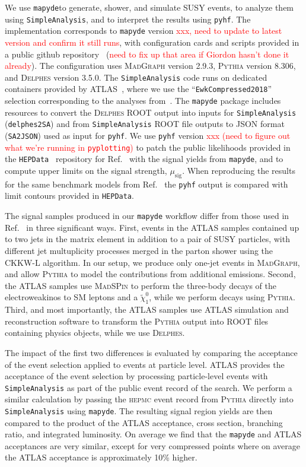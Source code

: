 \documentclass{article}
\newcommand{\chioz}{\ensuremath{\widetilde{\chi}_{1}^{0}}}
\newcommand{\mapyde}{\texttt{mapyde}}
\newcommand{\simpleanalysis}{\texttt{SimpleAnalysis}}
\newcommand{\madgraph}{\textsc{MadGraph}}
\newcommand{\madspin}{\textsc{MadSPin}}
\newcommand{\pythia}{\textsc{Pythia}}
\newcommand{\delphes}{\textsc{Delphes}}
\newcommand{\pyhf}{\texttt{pyhf}}
\newcommand{\musig}{\ensuremath{\mu_{\mathrm{sig}}}}
\newcommand{\hepdata}{\texttt{HEPData}}
\newcommand{\hepmc}{\textsc{hepmc}}
\begin{document}
We use \mapyde to generate, shower, and simulate SUSY events, to analyze them using \simpleanalysis, and to interpret the results using \pyhf.  The implementation corresponds to \mapyde{} version \textcolor{red}{xxx, need to update to latest version and confirm it still runs}, with configuration cards and scripts provided in a public github repository~\cite{mapyde-user} (\textcolor{red}{need to fix up that area if Giordon hasn't done it already}).  The configuration uses \madgraph{} version 2.9.3, \pythia{} version 8.306, and \delphes{} version 3.5.0.  The \simpleanalysis{} code runs on dedicated containers provided by ATLAS~\cite{SAGitLabRegistry}, where we use the ``\texttt{EwkCompressed2018}'' selection corresponding to the analyses from~\cite{ATLAS:2019lng}.  The \mapyde{} package includes resources to convert the \delphes{} ROOT output into inputs for \simpleanalysis{} (\texttt{delphes2SA}) and from \simpleanalysis{} ROOT file outputs to JSON format (\texttt{SA2JSON}) used as input for \pyhf.  We use \pyhf{} version \textcolor{red}{xxx (need to figure out what we're running in \texttt{pyplotting})} to patch the public likelihoods provided in the \hepdata~\cite{HepData} repository for Ref.~\cite{ATLAS:2019lng} with the signal yields from \mapyde, and to compute upper limits on the signal strength, \musig.  When reproducing the results for the same benchmark models from Ref.~\cite{ATLAS:2019lng} the \pyhf{} output is compared with limit contours provided in \hepdata.

The signal samples produced in our \mapyde{} workflow differ from those used in Ref.~\cite{ATLAS:2019lng} in three significant ways.  First, events in the ATLAS samples contained up to two jets in the matrix element in addition to a pair of SUSY particles, with different jet multuplicity processes merged in the parton shower using the CKKW-L algorithm.  In our setup, we produce only one-jet events in \madgraph, and allow \pythia{} to model the contributions from additional emissions.  Second, the ATLAS samples use \madspin{} to perform the three-body decays of the electroweakinos to SM leptons and a \chioz, while we perform decays using \pythia.  Third, and most importantly, the ATLAS samples use ATLAS simulation and reconstruction software to transform the \pythia{} output into ROOT files containing physics objects, while we use \delphes.

The impact of the first two differences is evaluated by comparing the acceptance of the event selection applied to events at particle level.  ATLAS provides the acceptance of the event selection by processing particle-level events with \simpleanalysis{} as part of the public event record of the search.  We perform a similar calculation by passing the \hepmc{} event record from \pythia{} directly into \simpleanalysis{} using \mapyde.  The resulting signal region yields are then compared to the product of the ATLAS acceptance, cross section, branching ratio, and integrated luminosity.  On average we find that the \mapyde{} and ATLAS acceptances are very similar, except for very compressed points where on average the ATLAS acceptance is approximately 10\% higher.
\end{document}
